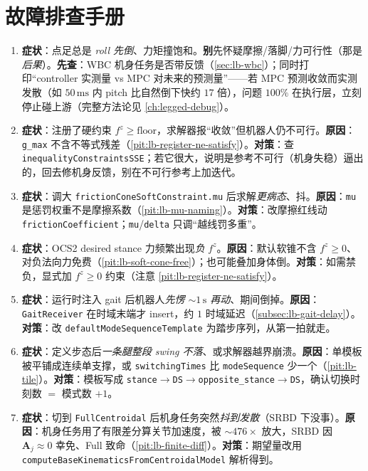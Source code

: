 \section*{故障排查手册}
\begin{enumerate}
  \item \textbf{症状}：点足总是 \emph{roll 先倒}、力矩撞饱和。\textbf{别}先怀疑摩擦/落脚/力可行性（那是\emph{后果}）。\textbf{先查}：WBC 机身任务是否带反馈（\cref{sec:lb-wbc}）；同时打印“controller 实测量 vs MPC 对未来的预测量”——若 MPC 预测收敛而实测发散（如 $50\,\mathrm{ms}$ 内 pitch 比自然倒下快约 $17$ 倍），问题 $100\%$ 在执行层，立刻停止碰上游（完整方法论见 \cref{ch:legged-debug}）。
  \item \textbf{症状}：注册了硬约束 $f^z\ge\text{floor}$，求解器报“收敛”但机器人仍不可行。\textbf{原因}：\texttt{g\_max} 不含不等式残差（\cref{pit:lb-register-ne-satisfy}）。\textbf{对策}：查 \texttt{inequalityConstraintsSSE}；若它很大，说明是参考不可行（机身失稳）逼出的，回去修机身反馈，别在不可行参考上加迭代。
  \item \textbf{症状}：调大 \texttt{frictionConeSoftConstraint.\allowbreak mu} 后求解\emph{更病态}、抖。\textbf{原因}：\texttt{mu} 是惩罚权重不是摩擦系数（\cref{pit:lb-mu-naming}）。\textbf{对策}：改摩擦红线动 \texttt{frictionCoefficient}；\texttt{mu}/\allowbreak\texttt{delta} 只调“越线罚多重”。
  \item \textbf{症状}：OCS2 desired stance 力频繁出现\emph{负} $f^z$。\textbf{原因}：默认软锥不含 $f^z\ge 0$、对负法向力免费（\cref{pit:lb-soft-cone-free}）；也可能叠加身体倒。\textbf{对策}：如需禁负，显式加 $f^z\ge 0$ 约束（注意 \cref{pit:lb-register-ne-satisfy}）。
  \item \textbf{症状}：运行时注入 gait 后机器人\emph{先愣 $\sim 1\,\mathrm{s}$ 再动}、期间倒掉。\textbf{原因}：\texttt{GaitReceiver} 在时域末端才 insert，约 $1$ 时域延迟（\cref{subsec:lb-gait-delay}）。\textbf{对策}：改 \texttt{defaultModeSequenceTemplate} 为踏步序列，从第一拍就走。
  \item \textbf{症状}：定义步态后\emph{一条腿整段 swing 不落}、或求解器越界崩溃。\textbf{原因}：单模板被平铺成连续单支撑，或 \texttt{switchingTimes} 比 \texttt{modeSequence} 少一个（\cref{pit:lb-tile}）。\textbf{对策}：模板写成 \texttt{stance$\to$DS$\to$opposite\_stance$\to$DS}，确认切换时刻数 $=$ 模式数 $+1$。
  \item \textbf{症状}：切到 \texttt{FullCentroidal} 后机身任务突然\emph{抖到发散}（SRBD 下没事）。\textbf{原因}：机身任务用了有限差分算关节加速度，被 $\sim 476\times$ 放大，SRBD 因 $\mathbf A_j\approx 0$ 幸免、Full 致命（\cref{pit:lb-finite-diff}）。\textbf{对策}：期望量改用 \texttt{computeBaseKinematicsFromCentroidalModel} 解析得到。
\end{enumerate}
